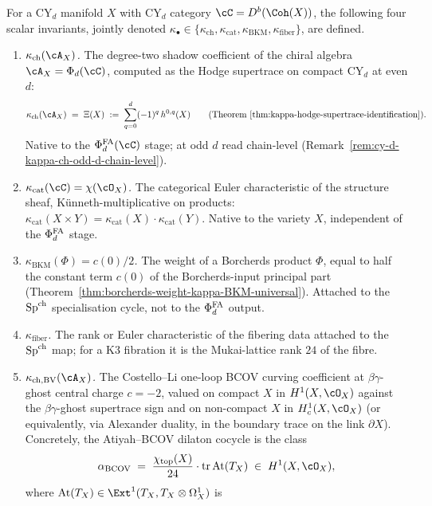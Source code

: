 \begin{definition}
\label{def:four-kappa-bullet-invariants}
For a CY$_d$ manifold $X$ with CY$_d$ category $\cC = D^b(\Coh(X))$,
the following four scalar invariants, jointly denoted
$\kappa_\bullet \in \{\kappa_{\mathrm{ch}},\kappa_{\mathrm{cat}},
\kappa_{\mathrm{BKM}},\kappa_{\mathrm{fiber}}\}$, are defined.
\begin{enumerate}[label=\textup{(\roman*)}]
\item \emph{$\kappa_{\mathrm{ch}}(\cA_X)$.} The degree-two shadow
 coefficient of the chiral algebra
 $\cA_X = \Phi_d(\cC)$, computed as the Hodge supertrace on compact
 CY$_d$ at even $d$:
 \[
 \kappa_{\mathrm{ch}}(\cA_X) \;=\; \Xi(X)
 \;:=\; \sum_{q = 0}^{d} (-1)^q\, h^{0, q}(X)
 \qquad\text{(Theorem~\ref{thm:kappa-hodge-supertrace-identification}).}
 \]
 Native to the $\PhiFA_d(\cC)$ stage; at odd $d$ read chain-level
 (Remark~\ref{rem:cy-d-kappa-ch-odd-d-chain-level}).
\item \emph{$\kappa_{\mathrm{cat}}(\cC) = \chi(\cO_X)$.} The categorical
 Euler characteristic of the structure sheaf, K\"unneth-multiplicative
 on products: $\kappa_{\mathrm{cat}}(X \times Y) = \kappa_{\mathrm{cat}}(X)
 \cdot \kappa_{\mathrm{cat}}(Y)$. Native to the variety $X$,
 independent of the $\Phi^{\mathrm{FA}}_d$ stage.
\item \emph{$\kappa_{\mathrm{BKM}}(\Phi) = c(0)/2$.} The weight of a
 Borcherds product $\Phi$, equal to half the constant term $c(0)$ of
 the Borcherds-input principal part
 (Theorem~\ref{thm:borcherds-weight-kappa-BKM-universal}). Attached to
 the $\mathrm{Sp}^{\mathrm{ch}}$ specialisation cycle, not to the $\Phi^{\mathrm{FA}}_d$ output.
\item \emph{$\kappa_{\mathrm{fiber}}$.} The rank or Euler characteristic
 of the fibering data attached to the $\mathrm{Sp}^{\mathrm{ch}}$ map; for a K3 fibration
 it is the Mukai-lattice rank $24$ of the fibre.
\item \emph{$\kchBV(\cA_X)$.} The Costello--Li one-loop BCOV curving
 coefficient at $\beta\gamma$-ghost central charge $c = -2$, valued
 on compact $X$ in $H^1(X, \cO_X)$ against the $\beta\gamma$-ghost
 supertrace sign and on non-compact $X$ in $H^1_c(X, \cO_X)$ (or
 equivalently, via Alexander duality, in the boundary trace on the
 link $\partial X$). Concretely, the Atiyah--BCOV dilaton cocycle
 is the class
 \[
 \alpha_{\mathrm{BCOV}}
 \;=\; \frac{\chi_{\mathrm{top}}(X)}{24} \cdot
 \mathrm{tr}\, \mathrm{At}(T_X)
 \;\in\; H^1(X, \cO_X),
 \]
 where $\mathrm{At}(T_X) \in \Ext^1(T_X, T_X \otimes \Omega^1_X)$ is

\end{enumerate}
\end{definition}
